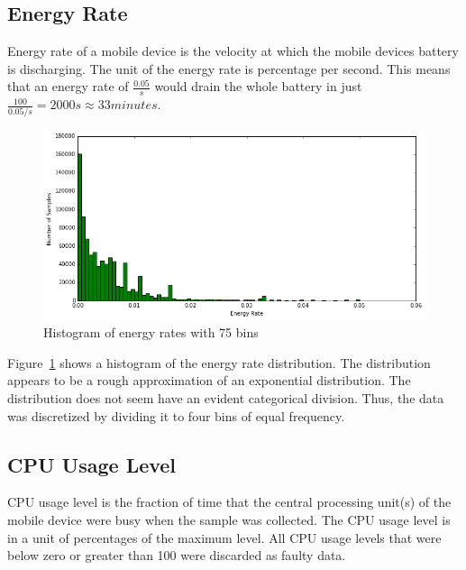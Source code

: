 \subsection{Energy Rate}

Energy rate of a mobile device is the velocity at which the mobile devices battery is discharging. The unit of the energy rate is percentage per second. This means that an energy rate of $\frac{0.05}{s}$ would drain the whole battery in just $\frac{100}{0.05 / s} = 2000 s \approx 33 minutes$.

\begin{figure}[!htbp]
	\centering
	\includegraphics[width=\textwidth]{images/carat-data/energy_rate.png}
	\caption{Histogram of energy rates with 75 bins}
	\label{figure:carat-data-energy-rate}
\end{figure}  

Figure~\ref{figure:carat-data-energy-rate} shows a histogram of the energy rate distribution. The distribution appears to be a rough approximation of an exponential distribution. The distribution does not seem have an evident categorical division. Thus, the data was discretized by dividing it to four bins of equal frequency. 

\subsection{CPU Usage Level}  

CPU usage level is the fraction of time that the central processing unit(s) of the mobile device were busy when the sample was collected. The CPU usage level is in a unit of percentages of the maximum level. All CPU usage levels that were below zero or greater than 100 were discarded as faulty data.

